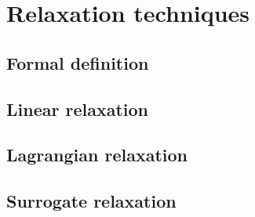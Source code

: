\chapter{Relaxation techniques}

\section{Formal definition}

\section{Linear relaxation}

\section{Lagrangian relaxation}

\section{Surrogate relaxation}